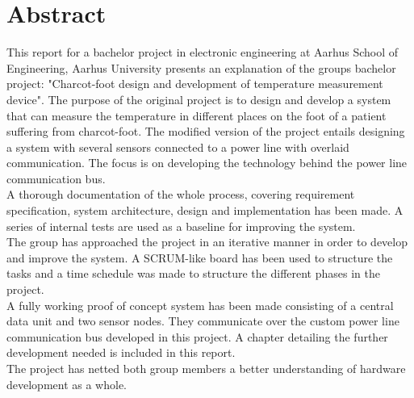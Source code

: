 \chapter{Abstract}
This report for a bachelor project in electronic engineering at Aarhus School of Engineering, Aarhus University presents an explanation of the groups bachelor project: "Charcot-foot design and development of temperature measurement device". The purpose of the original project is to design and develop a system that can measure the temperature in different places on the foot of a patient suffering from charcot-foot. The modified version of the project entails designing a system with several sensors connected to a power line with overlaid communication. The focus is on developing the technology behind the power line communication bus.\\
A thorough documentation of the whole process, covering requirement specification, system architecture, design and implementation has been made. A series of internal tests are used as a baseline for improving the system.\\
The group has approached the project in an iterative manner in order to develop and improve the system. A SCRUM-like board has been used to structure the tasks and a time schedule was made to structure the different phases in the project.\\
A fully working proof of concept system has been made consisting of a central data unit and two sensor nodes. They communicate over the custom power line communication bus developed in this project. A chapter detailing the further development needed is included in this report.\\
The project has netted both group members a better understanding of hardware development as a whole.\\

